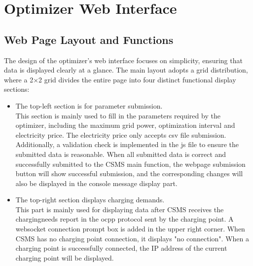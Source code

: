 \documentclass[
english,
ruledheaders=section,%
class=report,%
thesis={type=Report},%
accentcolor=9c,%
custommargins=true,%
marginpar=false,%
parskip=half-,%
fontsize=11pt,%
logofile={img/tuda_logo.pdf}, %
]{tudapub}
\begin{document}
        \section{Optimizer Web Interface}

        \subsection{Web Page Layout and Functions}

        The design of the optimizer's web interface focuses on simplicity, ensuring that data is displayed clearly at a glance. The main layout adopts a grid distribution, where a 2×2 grid divides the entire page into four distinct functional display sections:



        \begin{itemize}
            \item The top-left section is for parameter submission.\\
            This section is mainly used to fill in the parameters required by the optimizer, including the maximum grid power, optimization interval and electricity price. The electricity price only accepts csv file submission. Additionally, a validation check is implemented in the js file to ensure the submitted data is reasonable. When all submitted data is correct and successfully submitted to the CSMS main function, the webpage submission button will show successful submission, and the corresponding changes will also be displayed in the console message display part.
            \item The top-right section displays charging demands.\\
            This part is mainly used for displaying data after CSMS receives the chargingneeds report in the ocpp protocol sent by the charging point. A websocket connection prompt box is added in the upper right corner. When CSMS has no charging point connection, it displays "no connection". When a charging point is successfully connected, the IP address of the current charging point will be displayed.

\end{itemize}
\end{document}
